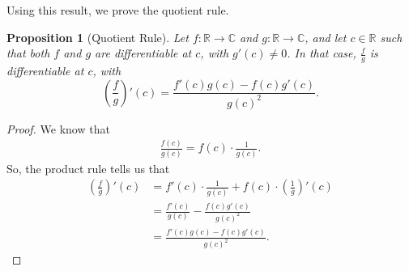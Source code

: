 \documentclass[a4paper, openany]{memoir}
\theoremstyle{definition}
\theoremstyle{plain}
\newtheorem{proposition}[definition]{Proposition}
\begin{document}
\noindent Using this result, we prove the quotient rule.
\begin{proposition}[Quotient Rule]
Let $f: \mathbb{R} \to \mathbb{C}$ and $g: \mathbb{R} \to \mathbb{C}$, and let $c \in \mathbb{R}$ such that both $f$ and $g$ are differentiable at $c$, with $g'(c) \neq 0$. In that case, $\frac{f}{g}$ is differentiable at $c$, with
\[\left(\frac{f}{g}\right)'(c) = \frac{f'(c) g(c) - f(c) g'(c)}{g(c)^2}.\]
\end{proposition}
\begin{proof}
We know that
\begin{align*}
    \frac{f(c)}{g(c)} = f(c) \cdot \frac{1}{g(c)}.
\end{align*}
So, the product rule tells us that
\begin{align*}
    \left(\frac{f}{g}\right)'(c) &= f'(c) \cdot \frac{1}{g(c)} + f(c) \cdot \left(\frac{1}{g}\right)'(c) \\
    &= \frac{f'(c)}{g(c)} - \frac{f(c) g'(c)}{g(c)^2} \\
    &= \frac{f'(c) g(c) - f(c) g'(c)}{g(c)^2}.
\end{align*}
\end{proof}
\end{document}
